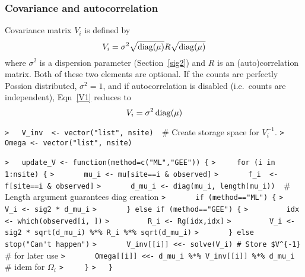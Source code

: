 \documentclass[a4paper]{article}
\begin{document}
\subsubsection{Covariance and autocorrelation \label{covariance}}
Covariance matrix $V_i$ is defined by
\begin{equation}
  V_i = \sigma^2 \sqrt{\operatorname{diag}(\mu)} R \sqrt{\operatorname{diag}(\mu)} \label{V1}
\end{equation}
where $\sigma^2$ is a dispersion parameter (Section~\ref{sig2})
and $R$ is an (auto)correlation matrix.
Both of these two elements are optional.
If the counts are perfectly Possion distributed, $\sigma^2=1$,
and if autocorrelation is disabled (i.e.\ counts are independent),
Eqn~\eqref{V1} reduces to
\begin{equation}
  V_i = \sigma^2 \operatorname{diag}(\mu) \label{V2}
\end{equation}\par
\verb~>   V_inv  <- vector("list", nsite)  ~{\sffamily\# Create storage space for $V_i^{-1}$.}\newline
\verb~>   Omega <- vector("list", nsite)~\par

\verb~>   update_V <- function(method=c("ML","GEE")) {~\newline
\verb~>     for (i in 1:nsite) {~\newline
\verb~>       mu_i <- mu[site==i & observed]~\newline
\verb~>       f_i  <- f[site==i & observed]~\newline
\verb~>       d_mu_i <- diag(mu_i, length(mu_i))  ~{\sffamily\# Length argument guarantees diag creation}\newline
\verb~>       if (method=="ML") {~\newline
\verb~>         V_i <- sig2 * d_mu_i~\newline
\verb~>       } else if (method=="GEE") {~\newline
\verb~>         idx <- which(observed[i, ])~\newline
\verb~>         R_i <- Rg[idx,idx]~\newline
\verb~>         V_i <- sig2 * sqrt(d_mu_i) %*% R_i %*% sqrt(d_mu_i)~\newline
\verb~>       } else stop("Can't happen")~\newline
\verb~>       V_inv[[i]] <<- solve(V_i) # Store $V^{-1}  ~{\sffamily\# for later use}\newline
\verb~>       Omega[[i]] <<- d_mu_i %*% V_inv[[i]] %*% d_mu_i  ~{\sffamily\# idem for $\Omega_i$}\newline
\verb~>     }~\newline
\verb~>   }~\par
\end{document}
